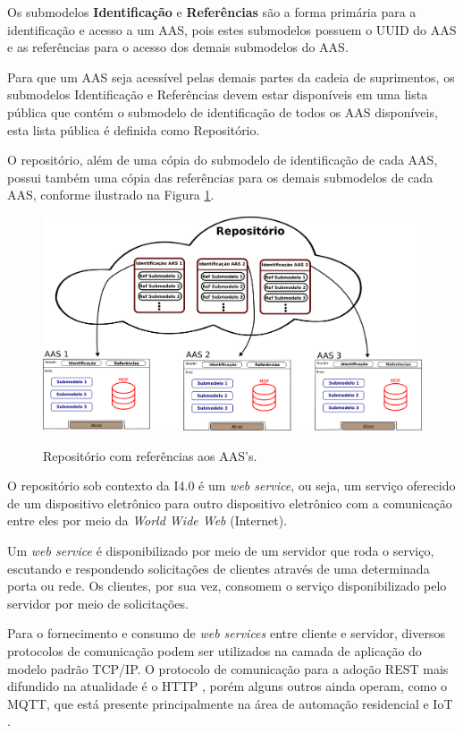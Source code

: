 \documentclass[
	12pt,				%
	oneside,			%
	a4paper,			%
	english,			%
	brazil				%
]{abntex2}
\begin{document}
	Os submodelos \textbf{Identificação} e \textbf{Referências} são a forma primária para a identificação e acesso a um AAS, pois estes submodelos possuem o UUID do AAS e as referências para o acesso dos demais submodelos do AAS.
	
	Para que um AAS seja acessível pelas demais partes da cadeia de suprimentos, os submodelos Identificação e Referências devem estar disponíveis em uma lista pública que contém o submodelo de identificação de todos os AAS disponíveis, esta lista pública é definida como Repositório.
	
	O repositório, além de uma cópia do submodelo de identificação de cada AAS, possui também uma cópia das referências para os demais submodelos de cada AAS, conforme ilustrado na Figura \ref{fig:repositorio}.
	
	
	\begin{figure}[H]
		\centering
		\caption{Repositório com referências aos AAS's.}
		\includegraphics[width=1\textwidth]{repositorio.png}
		\label{fig:repositorio}
	\end{figure}
	
	O repositório sob contexto da I4.0 é um \textit{web service}, ou seja, um serviço oferecido de um dispositivo eletrônico para outro dispositivo eletrônico com a comunicação entre eles por meio da \textit{World Wide Web} (Internet).
	
	Um \textit{web service} é disponibilizado por meio de um servidor que roda o serviço, escutando e respondendo solicitações de clientes através de uma determinada porta ou rede. Os clientes, por sua vez, consomem o serviço disponibilizado pelo servidor por meio de solicitações.
	
	Para o fornecimento e consumo de \textit{web services} entre cliente e servidor, diversos protocolos de comunicação podem ser utilizados na camada de aplicação do modelo padrão TCP/IP. O protocolo de comunicação para a adoção REST mais difundido na atualidade é o HTTP \cite{gruner2016restful}, porém alguns outros ainda operam, como o MQTT, que está presente principalmente na área de automação residencial e IoT \cite{yokotani2016mqtt}.
	
\end{document}
